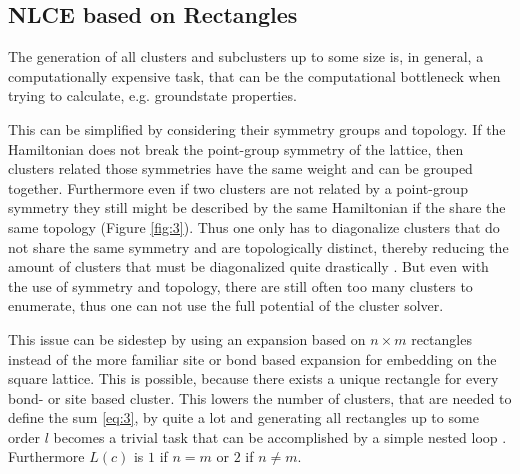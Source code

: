 \documentclass[a4paper,12pt]{article}
\begin{document}
\subsection{NLCE based on Rectangles}

The generation of all clusters and subclusters up to some size is, in
general, a computationally expensive task, that can be the
computational bottleneck when trying to calculate, e.g. groundstate
properties.

This can be simplified by considering their
symmetry groups and topology. If the Hamiltonian does not break the
point-group symmetry of the lattice,
then clusters related those symmetries have the same weight
and can be grouped together. Furthermore even if two clusters are not
related by a point-group symmetry they still might be described by the
same Hamiltonian if the share the same topology (Figure \ref{fig:3}). Thus
one only has to diagonalize clusters that do not share the same
symmetry and are topologically distinct, thereby reducing the amount of
clusters that must be diagonalized quite drastically \cite{Rigol}.
But even with the use of symmetry and topology, there are still
often too many clusters to enumerate, thus one can not use the full
potential of the cluster solver.

This issue can be sidestep by using an expansion based on $n \times m$
rectangles instead of the more familiar site or bond based
expansion for embedding on the square lattice. This is possible,
because there exists a unique rectangle for every bond- or site
based cluster. This lowers the number of clusters, that are needed to
define the sum \eqref{eq:3},  by quite a lot and generating all rectangles up to some order $l$ becomes a
trivial task that can be accomplished by a simple nested
loop \cite{Kallin}. Furthermore $L(c)$ is $1$ if $n=m$ or $2$ if $n
\neq m$.
\end{document}
